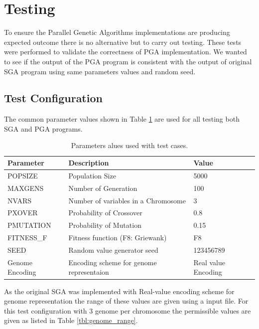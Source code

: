 \section{Testing}
To ensure the Parallel Genetic Algorithms implementations are producing expected outcome there is no alternative but to carry out testing. These tests were performed to validate the correctness of PGA implementation. We wanted to see if the output of the PGA program is consistent with the output of original SGA program using same parameters values and random seed.

\subsection{Test Configuration}
\label{test_config}
The common parameter values shown in Table \ref{tbl:test_params} are used for all testing both SGA and PGA programs.

\begin{table}[]
\centering
\caption{Parameters alues used with test cases.}
\label{tbl:test_params}
\begin{tabular}{|l|l|l|}
\hline
\textbf{Parameter}  & \textbf{Description }                        & \textbf{Value}     \\ \hline
POPSIZE    & Population Size                     & 5000      \\ \hline
MAXGENS    & Number of Generation                & 100       \\ \hline
NVARS      & Number of variables in a Chromosome & 3         \\ \hline
PXOVER     & Probability of Crossover            & 0.8       \\ \hline
PMUTATION  & Probability of Mutation             & 0.15      \\ \hline
FITNESS\_F & Fitness function (F8: Griewank)                   & F8        \\ \hline
SEED       & Random value generator seed         & 123456789 \\ \hline
Genome Encoding       & Encoding scheme for genome representaion         & Real value Encoding \\ \hline
\end{tabular}
\end{table}

As the original SGA was implemented with Real-value encoding scheme for genome representation the range of these values are given using a input file. For this test configuration with 3 genome per chromosome the permissible values are given as listed in Table \ref{tbl:genome_range}.

